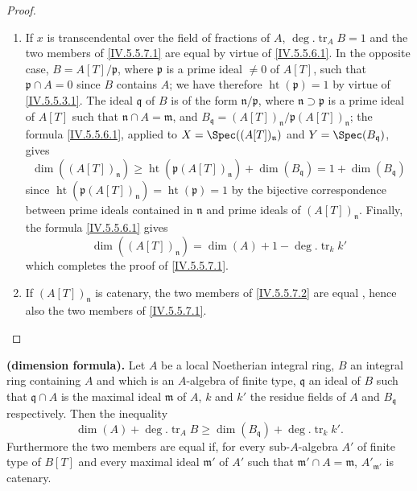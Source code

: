 \begin{proof}
\begin{enumerate}[label=(\roman*)]
  \item If $x$ is transcendental over the field of fractions of $A$, $\deg.\operatorname{tr}_A B=1$ and the two members of \eqref{IV.5.5.7.1} are equal by virtue of \eqref{IV.5.5.6.1}.
In the opposite case, $B=A[T]/\mathfrak{p}$, where $\mathfrak{p}$ is a prime ideal $\neq 0$ of $A[T]$, such that $\mathfrak{p}\cap A=0$ since $B$ contains $A$; we have therefore $\operatorname{ht}(\mathfrak{p})=1$ by virtue of \eqref{IV.5.5.3.1}.
The ideal $\mathfrak{q}$ of $B$ is of the form $\mathfrak{n}/\mathfrak{p}$, where $\mathfrak{n}\supset\mathfrak{p}$ is a prime ideal of $A[T]$ such that $\mathfrak{n}\cap A=\mathfrak{m}$, and $B_\mathfrak{q}=(A[T])_\mathfrak{n}/\mathfrak{p}(A[T])_\mathfrak{n}$; the formula \eqref{IV.5.5.6.1}, applied to $X=\Spec((A[T])_\mathfrak{n})$ and $Y=\Spec(B_\mathfrak{q})$, gives
\[
\tag{5.5.7.2}\label{IV.5.5.7.2}
  \dim((A[T])_\mathfrak{n}) \geq \operatorname{ht}(\mathfrak{p}(A[T])_\mathfrak{n}) + \dim(B_\mathfrak{q}) = 1 + \dim(B_\mathfrak{q})
\]
since $\operatorname{ht}(\mathfrak{p}(A[T])_\mathfrak{n})=\operatorname{ht}(\mathfrak{p})=1$ by the bijective correspondence between prime ideals contained in $\mathfrak{n}$ and prime ideals of $(A[T])_\mathfrak{n}$.
Finally, the formula \eqref{IV.5.5.6.1} gives
\[
\tag{5.5.7.3}\label{IV.5.5.7.3}
  \dim((A[T])_\mathfrak{n}) = \dim(A) + 1 - \deg.\operatorname{tr}_k k'
\]
which completes the proof of \eqref{IV.5.5.7.1}.
  \item If $(A[T])_\mathfrak{n}$ is catenary, the two members of \eqref{IV.5.5.7.2} are equal , hence also the two members of \eqref{IV.5.5.7.1}.
\end{enumerate}
\end{proof}

\begin{theorem}[5.5.8]
\label{IV.5.5.8}
\textbf{(dimension formula).}
Let $A$ be a local Noetherian integral ring, $B$ an integral ring containing $A$ and which is an $A$-algebra of finite type, $\mathfrak{q}$ an ideal of $B$ such that $\mathfrak{q}\cap A$ is the maximal ideal $\mathfrak{m}$ of $A$, $k$ and $k'$ the residue fields of $A$ and $B_\mathfrak{q}$ respectively.
Then the inequality
\[
\tag{5.5.8.1}\label{IV.5.5.8.1}
  \dim(A) + \deg.\operatorname{tr}_A B \geq \dim(B_\mathfrak{q}) + \deg.\operatorname{tr}_k k'.
\]
Furthermore the two members are equal if, for every sub-$A$-algebra $A'$ of finite type of $B[T]$ and every maximal ideal $\mathfrak{m}'$ of $A'$ such that $\mathfrak{m}'\cap A=\mathfrak{m}$, $A'_{\mathfrak{m}'}$ is catenary.
\end{theorem}

